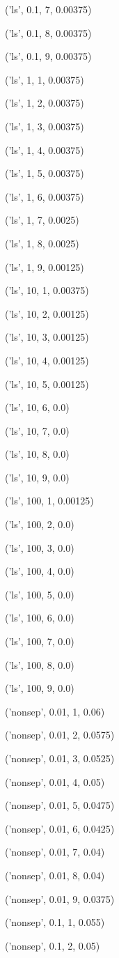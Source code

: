 \documentclass{paper}
\begin{document}
\begin{enumerate}
('ls', 0.1, 7, 0.00375)

('ls', 0.1, 8, 0.00375)

('ls', 0.1, 9, 0.00375)

('ls', 1, 1, 0.00375)

('ls', 1, 2, 0.00375)

('ls', 1, 3, 0.00375)

('ls', 1, 4, 0.00375)

('ls', 1, 5, 0.00375)

('ls', 1, 6, 0.00375)

('ls', 1, 7, 0.0025)

('ls', 1, 8, 0.0025)

('ls', 1, 9, 0.00125)

('ls', 10, 1, 0.00375)

('ls', 10, 2, 0.00125)

('ls', 10, 3, 0.00125)

('ls', 10, 4, 0.00125)

('ls', 10, 5, 0.00125)

('ls', 10, 6, 0.0)

('ls', 10, 7, 0.0)

('ls', 10, 8, 0.0)

('ls', 10, 9, 0.0)

('ls', 100, 1, 0.00125)

('ls', 100, 2, 0.0)

('ls', 100, 3, 0.0)

('ls', 100, 4, 0.0)

('ls', 100, 5, 0.0)

('ls', 100, 6, 0.0)

('ls', 100, 7, 0.0)

('ls', 100, 8, 0.0)

('ls', 100, 9, 0.0)

('nonsep', 0.01, 1, 0.06)

('nonsep', 0.01, 2, 0.0575)

('nonsep', 0.01, 3, 0.0525)

('nonsep', 0.01, 4, 0.05)

('nonsep', 0.01, 5, 0.0475)

('nonsep', 0.01, 6, 0.0425)

('nonsep', 0.01, 7, 0.04)

('nonsep', 0.01, 8, 0.04)

('nonsep', 0.01, 9, 0.0375)

('nonsep', 0.1, 1, 0.055)

('nonsep', 0.1, 2, 0.05)


\end{enumerate}
\end{document}
